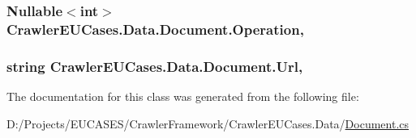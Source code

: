 \hypertarget{class_crawler_e_u_cases_1_1_data_1_1_document_a5bfe55294b3fec7c4f3c894bcf17b140}{
\subsubsection[{Operation}]{\setlength{\rightskip}{0pt plus 5cm}Nullable$<$int$>$ Crawler\-E\-U\-Cases.\-Data.\-Document.\-Operation\hspace{0.3cm}{\ttfamily [get]}, {\ttfamily [set]}}}\label{class_crawler_e_u_cases_1_1_data_1_1_document_a5bfe55294b3fec7c4f3c894bcf17b140}
\hypertarget{class_crawler_e_u_cases_1_1_data_1_1_document_ace21c0c53519fa84fc6011924ae1f4ee}{
\subsubsection[{Url}]{\setlength{\rightskip}{0pt plus 5cm}string Crawler\-E\-U\-Cases.\-Data.\-Document.\-Url\hspace{0.3cm}{\ttfamily [get]}, {\ttfamily [set]}}}\label{class_crawler_e_u_cases_1_1_data_1_1_document_ace21c0c53519fa84fc6011924ae1f4ee}


The documentation for this class was generated from the following file\-:\begin{DoxyCompactItemize}
\item 
D\-:/\-Projects/\-E\-U\-C\-A\-S\-E\-S/\-Crawler\-Framework/\-Crawler\-E\-U\-Cases.\-Data/\hyperlink{_crawler_e_u_cases_8_data_2_document_8cs}{Document.\-cs}\end{DoxyCompactItemize}
